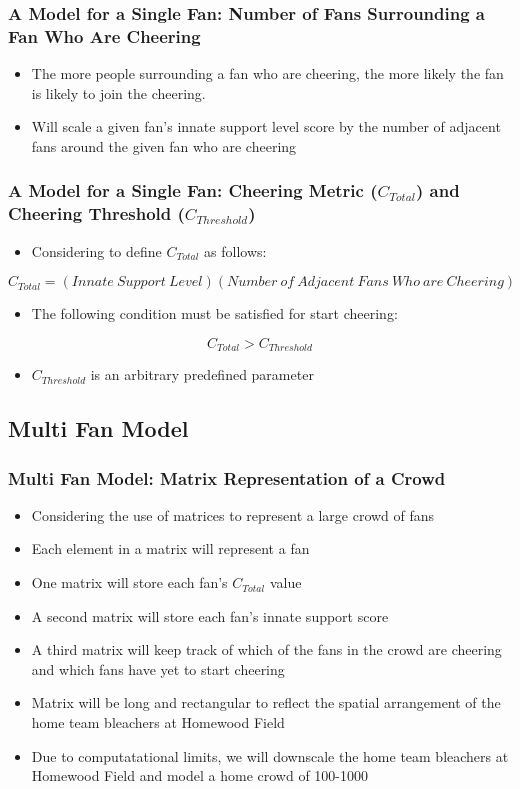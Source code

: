 \documentclass[compress,handout,10pt]{beamer}
\let\olditem\item
\renewcommand{\item}{\setlength{\itemsep}{0.5\baselineskip}\olditem}
\begin{document}
\begin {frame}
	\frametitle {A Model for a Single Fan: Number of Fans Surrounding a Fan Who Are Cheering}
		\begin{itemize}
			\item The more people surrounding a fan who are cheering, the more likely the fan is likely to join the cheering.
			\item Will scale a given fan's innate support level score by the number of adjacent fans around the given fan who are cheering
		\end {itemize}
\end {frame}

\begin {frame}
	\frametitle {A Model for a Single Fan: Cheering Metric ($C_{Total}$) and Cheering Threshold ($C_{Threshold}$)}
	\begin{itemize}
		\item Considering to define $C_{Total}$ as follows: \newline
	\end {itemize}
	$$C_{Total} = (Innate\ Support\ Level)(Number\ of\ Adjacent\ Fans\ Who\ are\ Cheering)$$
	\begin{itemize}
		\item The following condition must be satisfied for start cheering:\newline
	\end {itemize}	
	$$C_{Total}>C_{Threshold}$$
	\begin{itemize}
		\item $C_{Threshold}$ is an arbitrary predefined parameter
	\end {itemize}
\end {frame}


\subsection{Multi Fan Model}

\begin{frame}
\frametitle {Multi Fan Model: Matrix Representation of a Crowd}
	\begin {itemize}
		\item Considering the use of matrices to represent a large crowd of fans
		\item Each element in a matrix will represent a fan
		\item One matrix will store each fan's $C_{Total}$ value
		\item A second matrix will store each fan's innate support score
		\item A third matrix will keep track of which of the fans in the crowd are cheering and which fans have yet to start cheering 
		\item Matrix will be long and rectangular to reflect the spatial arrangement of the home team bleachers at Homewood Field
		\item Due to computatational limits, we will downscale the home team bleachers at Homewood Field and model a home crowd of 100-1000
	\end{itemize}		
\end{frame}
\end{document}
